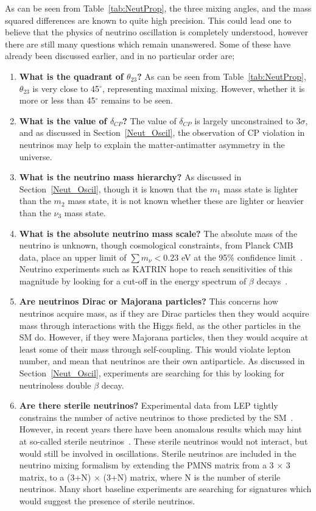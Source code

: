 As can be seen from Table~\ref{tab:NeutProp}, the three mixing angles, and the mass squared differences are known to quite high precision. This could lead one to believe that the physics of neutrino oscillation is completely understood, however there are still many questions which remain unanswered. Some of these have already been discussed earlier, and in no particular order are;
\begin{enumerate}
\item \textbf{What is the quadrant of $\theta_{23}$?} As can be seen from Table~\ref{tab:NeutProp}, $\theta_{23}$ is very close to 45$^{\circ}$, representing maximal mixing. However, whether it is more or less than 45$^{\circ}$ remains to be seen.
\item \textbf{What is the value of $\delta_{CP}$?} The value of $\delta_{CP}$ is largely unconstrained to 3$\sigma$, and as discussed in Section~\ref{Neut_Oscil}, the observation of CP violation in neutrinos may help to explain the matter-antimatter asymmetry in the universe.  
\item \textbf{What is the neutrino mass hierarchy?} As discussed in Section~\ref{Neut_Oscil}, though it is known that the $m_{1}$ mass state is lighter than the $m_{2}$ mass state, it is not known whether these are lighter or heavier than the $\nu_{3}$ mass state.
\item \textbf{What is the absolute neutrino mass scale?} The absolute mass of the neutrino is unknown, though cosmological constraints, from Planck CMB data, place an upper limit of $\sum m_{\nu} < 0.23$ eV at the 95\% confidence limit~\citep{Planck}. Neutrino experiments such as KATRIN hope to reach sensitivities of this magnitude by looking for a cut-off in the energy spectrum of $\beta$ decays~\citep{KATRIN}.
\item \textbf{Are neutrinos Dirac or Majorana particles?} This concerns how neutrinos acquire mass, as if they are Dirac particles then they would acquire mass through interactions with the Higgs field, as the other particles in the SM do. However, if they were Majorana particles, then they would acquire at least some of their mass through self-coupling. This would violate lepton number, and mean that neutrinos are their own antiparticle. As discussed in Section~\ref{Neut_Oscil}, experiments are searching for this by looking for neutrinoless double $\beta$ decay.
\item \textbf{Are there sterile neutrinos?} Experimental data from LEP tightly constrains the number of active neutrinos to those predicted by the SM~\citep{LEP}. However, in recent years there have been anomalous results which may hint at so-called sterile neutrinos~\citep{LSND1, LSND2, MiniBooNE}. These sterile neutrinos would not interact, but would still be involved in oscillations. Sterile neutrinos are included in the neutrino mixing formalism by extending the PMNS matrix from a 3 $\times$ 3 matrix, to a (3+N) $\times$ (3+N) matrix, where N is the number of sterile neutrinos. Many short baseline experiments are searching for signatures which would suggest the presence of sterile neutrinos.  
\end{enumerate}
